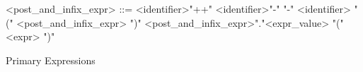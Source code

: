 \begin{Grammar}
 \begin{grammar}

    <post\_and\_infix\_expr> ::= <identifier>"++"
     \alt <identifier>"-" "-"
     \alt <identifier> "(" <post\_and\_infix\_expr> ")"
     \alt <post\_and\_infix\_expr>"."<expr\_value>
     \alt "(" <expr> ")"
  
 \end{grammar}
 \caption{Primary Expressions}\label{gra:primary}
\end{Grammar}




